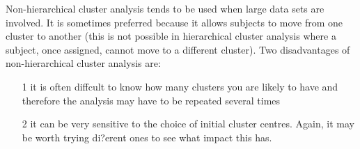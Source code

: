 Non-hierarchical cluster analysis tends to be used when large data sets are involved. It is
sometimes preferred because it allows subjects to move from one cluster to another (this is
not possible in hierarchical cluster analysis where a subject, once assigned, cannot move to a
different cluster). Two disadvantages of non-hierarchical cluster analysis are: 
\begin{itemize}
\item[1]it is often
diffcult to know how many clusters you are likely to have and therefore the analysis may have
to be repeated several times 
\item[2] it can be very sensitive to the choice of initial cluster centres. Again, it may be worth trying di?erent ones to see what impact this has.
\end{itemize}
